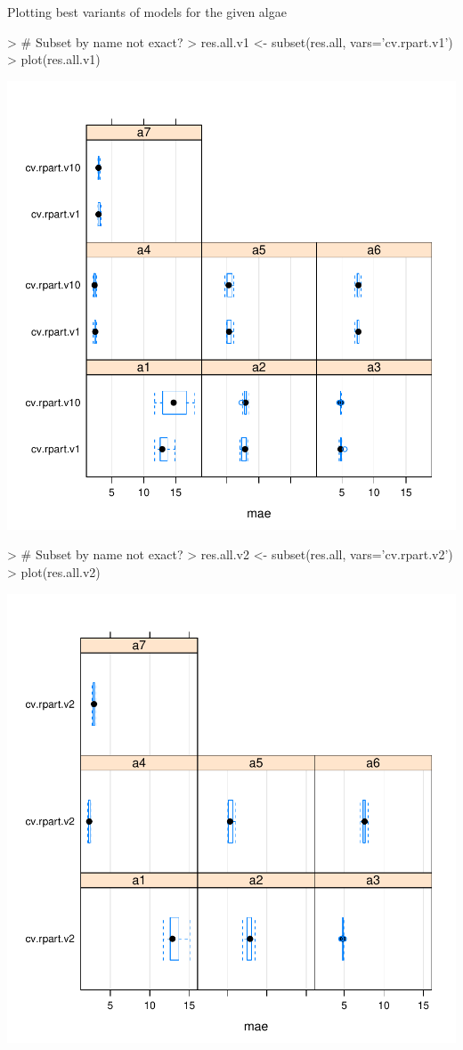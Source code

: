 \documentclass{article}
\begin{document}
Plotting best variants of models for the given algae

\begin{Schunk}
\begin{Sinput}
> # Subset by name not exact?
> res.all.v1 <- subset(res.all, vars='cv.rpart.v1')
> plot(res.all.v1)
\end{Sinput}
\end{Schunk}
\includegraphics{KevinZollicoffer_Assignment2-009}

\begin{Schunk}
\begin{Sinput}
> # Subset by name not exact?
> res.all.v2 <- subset(res.all, vars='cv.rpart.v2')
> plot(res.all.v2)
\end{Sinput}
\end{Schunk}
\includegraphics{KevinZollicoffer_Assignment2-010}
\end{document}
